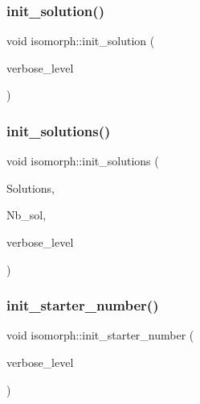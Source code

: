 \subsubsection{\texorpdfstring{init\+\_\+solution()}{init\_solution()}}
{\footnotesize\ttfamily void isomorph\+::init\+\_\+solution (\begin{DoxyParamCaption}\item[{\mbox{\hyperlink{galois_8h_a09fddde158a3a20bd2dcadb609de11dc}{I\+NT}}}]{verbose\+\_\+level }\end{DoxyParamCaption})}

\mbox{\label{classisomorph_a729746a01bd45d55565d0a11cda9e9a3}} 
\subsubsection{\texorpdfstring{init\+\_\+solutions()}{init\_solutions()}}
{\footnotesize\ttfamily void isomorph\+::init\+\_\+solutions (\begin{DoxyParamCaption}\item[{\mbox{\hyperlink{galois_8h_a09fddde158a3a20bd2dcadb609de11dc}{I\+NT}} $\ast$$\ast$}]{Solutions,  }\item[{\mbox{\hyperlink{galois_8h_a09fddde158a3a20bd2dcadb609de11dc}{I\+NT}} $\ast$}]{Nb\+\_\+sol,  }\item[{\mbox{\hyperlink{galois_8h_a09fddde158a3a20bd2dcadb609de11dc}{I\+NT}}}]{verbose\+\_\+level }\end{DoxyParamCaption})}

\mbox{\label{classisomorph_a93b1d8fa988ca12f5f231fc4420873b2}} 
\subsubsection{\texorpdfstring{init\+\_\+starter\+\_\+number()}{init\_starter\_number()}}
{\footnotesize\ttfamily void isomorph\+::init\+\_\+starter\+\_\+number (\begin{DoxyParamCaption}\item[{\mbox{\hyperlink{galois_8h_a09fddde158a3a20bd2dcadb609de11dc}{I\+NT}}}]{verbose\+\_\+level }\end{DoxyParamCaption})}

